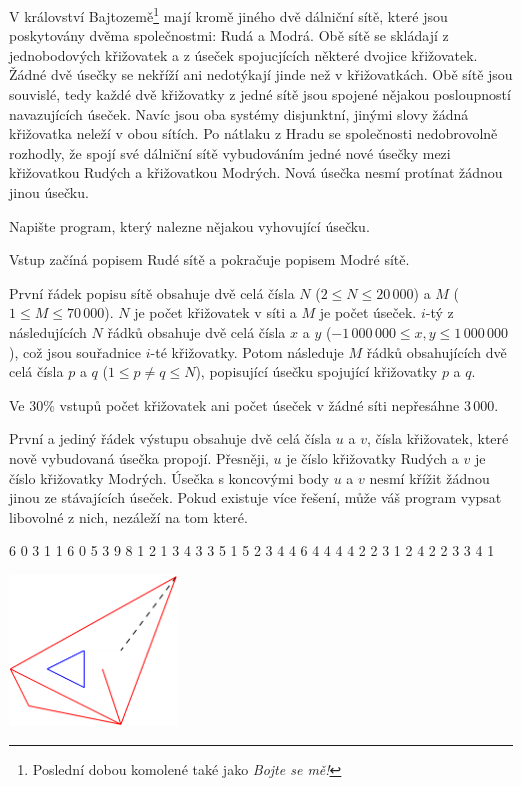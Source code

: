 





V království Bajtozemě\footnote{Poslední dobou komolené také jako \textit{Bojte se mě!}}
mají kromě jiného dvě dálniční sítě,
které jsou poskytovány dvěma společnostmi: Rudá a Modrá.
Obě sítě se skládají z jednobodových křižovatek a z úseček spojucjících
některé dvojice křižovatek. Žádné dvě úsečky se nekříží ani nedotýkají jinde než
v křižovatkách. Obě sítě jsou souvislé, tedy každé dvě křižovatky z jedné sítě
jsou spojené nějakou posloupností navazujících úseček. Navíc jsou oba systémy
disjunktní, jinými slovy žádná křižovatka neleží v obou sítích.
Po nátlaku z Hradu se společnosti nedobrovolně rozhodly,
že spojí své dálniční sítě vybudováním jedné nové úsečky mezi křižovatkou
Rudých a křižovatkou Modrých. Nová úsečka nesmí protínat žádnou jinou úsečku.

Napište program, který nalezne nějakou vyhovující úsečku.

Vstup začíná popisem Rudé sítě a pokračuje popisem Modré sítě.

První řádek popisu sítě obsahuje dvě celá čísla $N$ ($2 \leq N \leq 20\,000$) a
$M$ ($1 \leq M \leq 70\,000$). $N$ je počet křižovatek v síti a $M$ je počet
úseček. $i$-tý z následujících $N$ řádků obsahuje dvě celá čísla $x$ a $y$
($-1\,000\,000 \leq x,y \leq 1\,000\,000$), což jsou souřadnice $i$-té křižovatky.
Potom následuje $M$ řádků obsahujících dvě celá čísla $p$ a $q$
($1\leq p \neq q \leq N$), popisující úsečku spojující křižovatky $p$ a $q$.

\bigskip
Ve $30\%$ vstupů počet křižovatek ani počet úseček v žádné síti nepřesáhne $3\,000$.

První a jediný řádek výstupu obsahuje dvě celá čísla $u$ a $v$,
čísla křižovatek, které nově vybudovaná úsečka propojí.
Přesněji, $u$ je číslo křižovatky Rudých a $v$ je číslo křižovatky Modrých.
Úsečka s koncovými body $u$ a $v$ nesmí křížit žádnou jinou ze stávajících úseček.
Pokud existuje více řešení, může váš program vypsat libovolné z nich,
nezáleží na tom které.


 6
0 3
1 1
6 0
5 3
9 8
1 2
1 3
4 3
3 5
1 5
2 3
4 4
6 4
4 4
4 2
2 3
1 2
4 2
2 3
3 4
 1
\sampleCOMMENT

\includegraphics[height=4cm]{img/fig11.pdf}
\sampleEND


